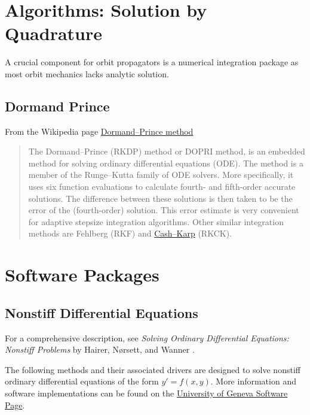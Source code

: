 % 

\section{Algorithms: Solution by Quadrature}
\label{sec:quadrature}

A crucial component for orbit propagators is a numerical integration package as most orbit mechanics lacks analytic solution.

\subsection{Dormand Prince}
From the Wikipedia page \href{https://en.wikipedia.org/wiki/Dormand%E2%80%93Prince_method}{Dormand–Prince method}
\begin{quote}
The Dormand–Prince (RKDP) method or DOPRI method, is an embedded method for solving ordinary differential equations (ODE). The method is a member of the Runge–Kutta family of ODE solvers. More specifically, it uses six function evaluations to calculate fourth- and fifth-order accurate solutions. The difference between these solutions is then taken to be the error of the (fourth-order) solution. This error estimate is very convenient for adaptive stepsize integration algorithms. Other similar integration methods are Fehlberg (RKF) and \href{https://en.wikipedia.org/wiki/Cash%E2%80%93Karp_method}{Cash–Karp} (RKCK). 
\end{quote}


\section{Software Packages}
\subsection{Nonstiff Differential Equations}

For a comprehensive description, see \emph{Solving Ordinary Differential Equations: Nonstiff Problems} by Hairer, N\o rsett, and Wanner \cite{Hairer1993}.

The following methods and their associated drivers are designed to solve nonstiff ordinary differential equations of the form \( y' = f(x, y) \). More information and software implementations can be found on the \href{http://www.unige.ch/~hairer/software.html}{University of Geneva Software Page}.

